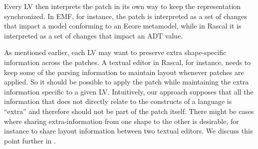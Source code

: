 
Every LV then interprets the patch in its own way to keep the representation synchronized.
In EMF, for instance, the patch is interpreted as a set of changes that impact a model conforming to an Ecore metamodel, while in Rascal it is interpreted as a set of changes that impact an ADT value.

As mentioned earlier, each LV may want to preserve extra shape-specific information across the patches.
A textual editor in Rascal, for instance, needs to keep some of the parsing information to maintain layout whenever patches are applied.
So it should be possible to apply the patch while maintaining the extra information specific to a given LV.
Intuitively, our approach supposes that all the information that does not directly relate to the constructs of a language is ``extra'' and therefore should not be part of the patch itself.
There might be cases where sharing extra-information from one shape to the other is desirable, for instance to share layout information between two textual editors.
We discuss this point further in .

